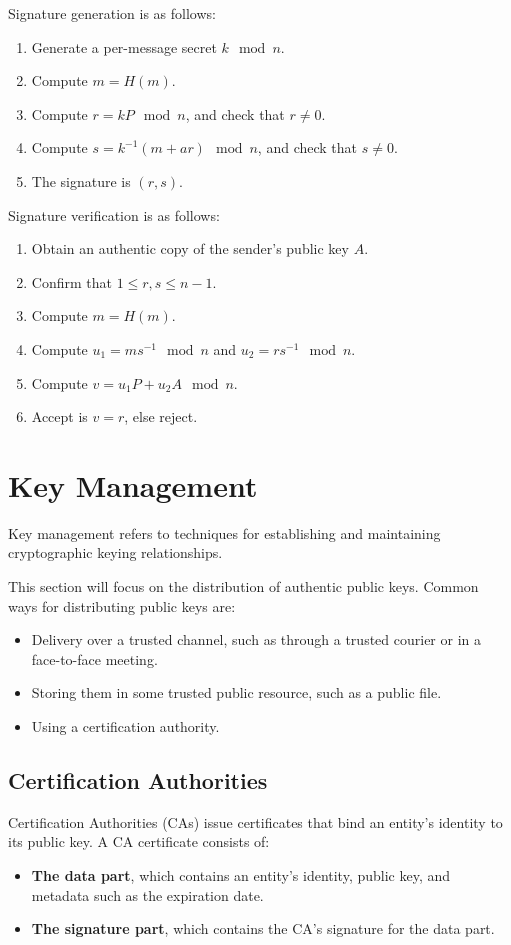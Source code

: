 \documentclass[12pt,titlepage]{article}
\let\stdsection\section
\renewcommand\section{\clearpage\stdsection}
\begin{document}
      Signature generation is as follows:
      \begin{enumerate}
        \item Generate a per-message secret $k \mod n$.
        \item Compute $m = H(m)$.
        \item Compute $r = kP \mod n$, and check that $r \neq 0$.
        \item Compute $s = k^{-1}(m + ar) \mod n$, and check that $s \neq 0$.
        \item The signature is $(r,s)$.
      \end{enumerate}

      Signature verification is as follows:
      \begin{enumerate}
        \item Obtain an authentic copy of the sender's public key $A$.
        \item Confirm that $1 \leq r, s \leq n - 1$.
        \item Compute $m = H(m)$.
        \item Compute $u_1 = ms^{-1} \mod n$ and $u_2 = rs^{-1} \mod n$.
        \item Compute $v = u_1P + u_2A \mod n$.
        \item Accept is $v = r$, else reject.
      \end{enumerate}

  \section{Key Management}

    Key management refers to techniques for establishing and maintaining cryptographic keying relationships.

    This section will focus on the distribution of authentic public keys. Common ways for distributing public
    keys are:
    \begin{itemize}
      \item Delivery over a trusted channel, such as through a trusted courier or in a face-to-face meeting.
      \item Storing them in some trusted public resource, such as a public file.
      \item Using a certification authority.
    \end{itemize}

    \subsection{Certification Authorities}
      Certification Authorities (CAs) issue certificates that bind an entity's identity to its public key. A
      CA certificate consists of:
      \begin{itemize}
        \item \textbf{The data part}, which contains an entity's identity, public key, and metadata such as
          the expiration date.
        \item \textbf{The signature part}, which contains the CA's signature for the data part.
      \end{itemize}
\end{document}
